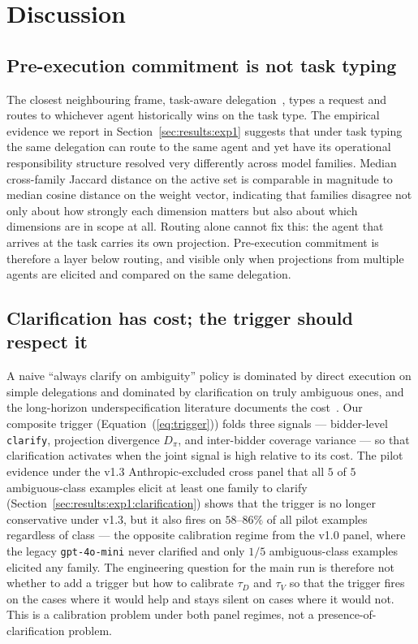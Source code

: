 \section{Discussion}
\label{sec:discussion}

\subsection{Pre-execution commitment is not task typing}
\label{sec:discussion:not_typing}

The closest neighbouring frame, task-aware delegation~\cite{taskaware2026}, types a request and routes to whichever agent historically wins on the task type. The empirical evidence we report in Section~\ref{sec:results:exp1} suggests that under task typing the same delegation can route to the same agent and yet have its operational responsibility structure resolved very differently across model families. Median cross-family Jaccard distance on the active set is comparable in magnitude to median cosine distance on the weight vector, indicating that families disagree not only about how strongly each dimension matters but also about which dimensions are in scope at all. Routing alone cannot fix this: the agent that arrives at the task carries its own projection. Pre-execution commitment is therefore a layer below routing, and visible only when projections from multiple agents are elicited and compared on the same delegation.

\subsection{Clarification has cost; the trigger should respect it}
\label{sec:discussion:clarification}

A naive ``always clarify on ambiguity'' policy is dominated by direct execution on simple delegations and dominated by clarification on truly ambiguous ones, and the long-horizon underspecification literature documents the cost~\cite{lhaw2024}. Our composite trigger (Equation~(\ref{eq:trigger})) folds three signals --- bidder-level \texttt{clarify}, projection divergence $D_\pi$, and inter-bidder coverage variance --- so that clarification activates when the joint signal is high relative to its cost. The pilot evidence under the v1.3 Anthropic-excluded cross panel that all $5$ of $5$ ambiguous-class examples elicit at least one family to clarify (Section~\ref{sec:results:exp1:clarification}) shows that the trigger is no longer conservative under v1.3, but it also fires on $58$--$86\%$ of all pilot examples regardless of class --- the opposite calibration regime from the v1.0 panel, where the legacy \texttt{gpt-4o-mini} never clarified and only $1/5$ ambiguous-class examples elicited any family. The engineering question for the main run is therefore not whether to add a trigger but how to calibrate $\tau_D$ and $\tau_V$ so that the trigger fires on the cases where it would help and stays silent on cases where it would not. This is a calibration problem under both panel regimes, not a presence-of-clarification problem.

